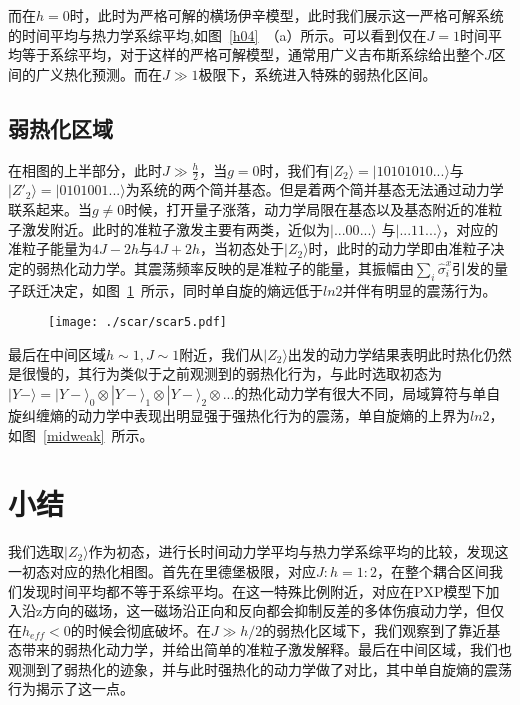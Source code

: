 而在$h=0$时，此时为严格可解的横场伊辛模型，此时我们展示这一严格可解系统的时间平均与热力学系综平均,如图~\ref{h04}~（a）所示。可以看到仅在$J=1$时间平均等于系综平均，对于这样的严格可解模型，通常用广义吉布斯系综给出整个$J$区间的广义热化预测\cite{vidmar2016generalized}。而在$J\gg 1$极限下，系统进入特殊的弱热化区间。



\subsection{弱热化区域}
在相图的上半部分，此时$J \gg \frac{h}{2}$，当$g=0$时，我们有$|Z_2\rangle=|10101010...\rangle$与$|Z'_{2}\rangle=|0101001...\rangle$为系统的两个简并基态。但是着两个简并基态无法通过动力学联系起来。当$g\neq 0$时候，打开量子涨落，动力学局限在基态以及基态附近的准粒子激发附近。此时的准粒子激发主要有两类，近似为$|...00...\rangle$
与$|...11...\rangle$，对应的准粒子能量为$4J-2h$与$4J+2h$，当初态处于$|Z_2\rangle$时，此时的动力学即由准粒子决定的弱热化动力学。其震荡频率反映的是准粒子的能量，其振幅由$\sum_i \hat{\sigma}_i^x$引发的量子跃迁决定，如图~\ref{weak}~所示，同时单自旋的熵远低于$ln2$并伴有明显的震荡行为。
\begin{figure}[h]
\centering
\texttt{[image: ./scar/scar5.pdf]}
\label{weak}
\end{figure}

最后在中间区域$h\sim 1, J \sim 1$附近，我们从$|Z_2\rangle$出发的动力学结果表明此时热化仍然是很慢的，其行为类似于之前观测到的弱热化行为，与此时选取初态为$|Y-\rangle = |Y-\rangle_0 \otimes|Y-\rangle_1\otimes |Y-\rangle_2 \otimes... $的热化动力学有很大不同，局域算符与单自旋纠缠熵的动力学中表现出明显强于强热化行为的震荡，单自旋熵的上界为$ln2$，如图~\ref{midweak}~所示。

\section{小结}\label{4sec:sum}
我们选取$|Z_2\rangle$作为初态，进行长时间动力学平均与热力学系综平均的比较，发现这一初态对应的热化相图。首先在里德堡极限，对应$J:h=1:2$，在整个耦合区间我们发现时间平均都不等于系综平均。在这一特殊比例附近，对应在PXP模型下加入沿z方向的磁场，这一磁场沿正向和反向都会抑制反差的多体伤痕动力学，但仅在$h_{eff}<0$的时候会彻底破坏。在$J\gg h/2$的弱热化区域下，我们观察到了靠近基态带来的弱热化动力学，并给出简单的准粒子激发解释。最后在中间区域，我们也观测到了弱热化的迹象，并与此时强热化的动力学做了对比，其中单自旋熵的震荡行为揭示了这一点。



